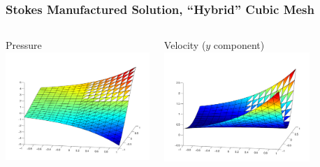 \documentclass[mathserif]{beamer}
\begin{document}
\begin{frame}
\frametitle{Stokes Manufactured Solution, ``Hybrid'' Cubic Mesh}
\begin{columns}[c]
\begin{column}{5.5cm}
\begin{block}{Pressure}
\includegraphics[width=5.5cm]{pressurecubic16x16}
\end{block}
\end{column}
\begin{column}{5.5cm}
\begin{block}{Velocity ($y$ component)}
\includegraphics[width=5.5cm]{u2cubic16x16}
\end{block}
\end{column}
\end{columns}
\vspace{3 mm}
\end{frame}
\end{document}
